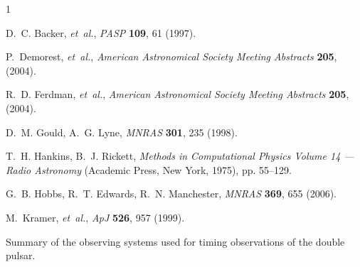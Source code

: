 \documentclass[12pt,psfig]{article}
\begin{document}
%
%


\begin{thebibliography}{1}

D.~C. Backer, {\it et~al.\/}, {\it PASP\/} {\bf 109}, 61 (1997).

P.~{Demorest}, {\it et~al.\/}, {\it American Astronomical Society Meeting
  Abstracts\/} {\bf 205},  (2004).

R.~D. {Ferdman}, {\it et~al.\/}, {\it American Astronomical Society Meeting
  Abstracts\/} {\bf 205},  (2004).

D.~M. Gould, A.~G. Lyne, {\it MNRAS\/} {\bf 301}, 235 (1998).

T.~H. {Hankins}, B.~J. {Rickett}, {\it Methods in Computational Physics Volume
  14 --- Radio Astronomy\/} (Academic Press, New York, 1975), pp. 55--129.

G.~B. {Hobbs}, R.~T. {Edwards}, R.~N. {Manchester}, {\it MNRAS\/} {\bf 369},
  655 (2006).

M.~Kramer, {\it et~al.\/}, {\it ApJ\/} {\bf 526}, 957 (1999).

\end{thebibliography}

\clearpage

Summary of the observing systems used for timing
  observations of the double pulsar.
\end{document}
